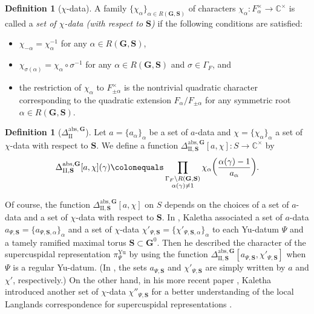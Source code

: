 \documentclass{amsart}
\newcommand{\abs}{\mathrm{abs}}
\newcommand{\Yu}{\mathrm{Yu}}
\newcommand{\C}{\mathbb{C}}
\newcommand{\bfG}{\mathbf{G}}
\newcommand{\bfS}{\mathbf{S}}
\newcommand{\II}{\mathrm{II}}
\theoremstyle{plain}
\theoremstyle{definition}
\newtheorem{defn}[thm]{Definition}
\theoremstyle{remark}
\theoremstyle{theorem}
\begin{document}
\begin{defn}[$\chi$-data]
A family $\{\chi_{\alpha}\}_{\alpha\in R(\bfG,\bfS)}$ of characters $\chi_{\alpha}\colon F_{\alpha}^{\times}\rightarrow\C^{\times}$ is called a \textit{set of $\chi$-data (with respect to $\bfS$)} if the following conditions are satisfied:
\begin{itemize}
\item
$\chi_{-\alpha}=\chi_{\alpha}^{-1}$ for any $\alpha\in R(\bfG,\bfS)$,
\item
$\chi_{\sigma(\alpha)}=\chi_{\alpha}\circ\sigma^{-1}$ for any $\alpha\in R(\bfG,\bfS)$ and $\sigma\in\Gamma_{F}$, and
\item
the restriction of $\chi_{\alpha}$ to $F_{\pm\alpha}^{\times}$ is the nontrivial quadratic character corresponding to the quadratic extension $F_{\alpha}/F_{\pm\alpha}$ for any symmetric root $\alpha\in R(\bfG,\bfS)$.
\end{itemize}
\end{defn}

\begin{defn}[$\Delta_{\II}^{\abs,\bfG}$]
Let $a=\{a_{\alpha}\}_{\alpha}$ be a set of $a$-data and $\chi=\{\chi_{\alpha}\}_{\alpha}$ a set of $\chi$-data with respect to $\bfS$.
We define a function $\Delta_{\II,\bfS}^{\abs,\bfG}[a,\chi]\colon S\rightarrow\C^{\times}$ by
\[
\Delta_{\II,\bfS}^{\abs,\bfG}[a,\chi](\gamma)
\colonequals \prod_{\begin{subarray}{c}\Gamma_{F}\backslash R(\bfG,\bfS)\\ \alpha(\gamma)\neq1\end{subarray}} \chi_{\alpha}\biggl(\frac{\alpha(\gamma)-1}{a_{\alpha}}\biggr).
\]
\end{defn}

Of course, the function $\Delta_{\II,\bfS}^{\abs,\bfG}[a,\chi]$ on $S$ depends on the choices of a set of $a$-data and a set of $\chi$-data with respect to $\bfS$.
In \cite[Section 4.7]{Kal19}, Kaletha associated a set of $a$-data $a_{\Psi,\bfS}=\{a_{\Psi,\bfS,\alpha}\}_{\alpha}$ and a set of $\chi$-data $\chi'_{\Psi,\bfS}=\{\chi'_{\Psi,\bfS,\alpha}\}_{\alpha}$ to each Yu-datum $\Psi$ and a tamely ramified maximal torus $\bfS\subset\bfG^{0}$.
Then he described the character of the supercuspidal representation $\pi_{\Psi}^{\Yu}$ by using the function $\Delta_{\II,\bfS}^{\abs,\bfG}[a_{\Psi,\bfS},\chi'_{\Psi,\bfS}]$ when $\Psi$ is a regular Yu-datum.
(In \cite[Section 4.7]{Kal19}, the sets $a_{\Psi,\bfS}$ and $\chi'_{\Psi,\bfS}$ are simply written by $a$ and $\chi'$, respectively.)
On the other hand, in his more recent paper \cite{Kal19-sc}, Kaletha introduced another set of $\chi$-data $\chi''_{\Psi,\bfS}$ for a better understanding of the local Langlands correspondence for supercuspidal representations \cite[Section 3.5]{Kal19-sc}.
\end{document}
